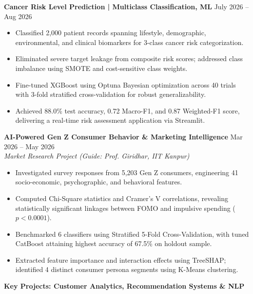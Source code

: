 \documentclass[10pt]{article}
\begin{document}
\textbf{Cancer Risk Level Prediction | Multiclass Classification, ML} \hfill July 2026 -- Aug 2026
\begin{itemize}[noitemsep, topsep=2pt, partopsep=0pt, parsep=1.5pt]
    \item Classified 2,000 patient records spanning lifestyle, demographic, environmental, and clinical biomarkers for 3-class cancer risk categorization.
    \item Eliminated severe target leakage from composite risk scores; addressed class imbalance using SMOTE and cost-sensitive class weights.
    \item Fine-tuned XGBoost using Optuna Bayesian optimization across 40 trials with 3-fold stratified cross-validation for robust generalizability.
    \item Achieved 88.0\% test accuracy, 0.72 Macro-F1, and 0.87 Weighted-F1 score, delivering a real-time risk assessment application via Streamlit.
\end{itemize}

\vspace{6pt}

\textbf{AI-Powered Gen Z Consumer Behavior \& Marketing Intelligence} \hfill Mar 2026 -- May 2026\\
\textit{Market Research Project (Guide: Prof. Giridhar, IIT Kanpur)}
\begin{itemize}[noitemsep, topsep=2pt, partopsep=0pt, parsep=1.5pt]
    \item Investigated survey responses from 5,203 Gen Z consumers, engineering 41 socio-economic, psychographic, and behavioral features.
    \item Computed Chi-Square statistics and Cramer's V correlations, revealing statistically significant linkages between FOMO and impulsive spending ($p < 0.0001$).
    \item Benchmarked 6 classifiers using Stratified 5-Fold Cross-Validation, with tuned CatBoost attaining highest accuracy of 67.5\% on holdout sample.
    \item Extracted feature importance and interaction effects using TreeSHAP; identified 4 distinct consumer persona segments using K-Means clustering.
\end{itemize}

\newpage

\begin{center}
    \textbf{Key Projects: Customer Analytics, Recommendation Systems \& NLP}
\end{center}
\vspace{-4pt}
\end{document}
